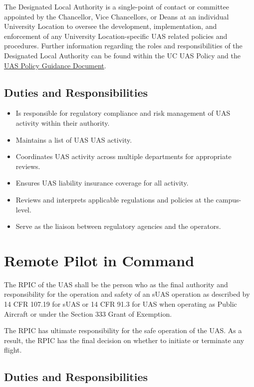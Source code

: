 \documentclass[
]{book}
\providecommand{\tightlist}{%
  \setlength{\itemsep}{0pt}\setlength{\parskip}{0pt}}
\begin{document}
The Designated Local Authority is a single-point of contact or committee appointed by the Chancellor, Vice Chancellors, or Deans at an individual University Location to oversee the development, implementation, and enforcement of any University Location-specific UAS related policies and procedures. Further information regarding the roles and responsibilities of the Designated Local Authority can be found within the UC UAS Policy and the \href{https://ucdrones.github.io/Policy_Guidance/}{UAS Policy Guidance Document}.

\subsection{Duties and Responsibilities}\label{duties-and-responsibilities-1}

\begin{itemize}
\tightlist
\item
  Is responsible for regulatory compliance and risk management of UAS activity within their authority.
\item
  Maintains a list of UAS UAS activity.
\item
  Coordinates UAS activity across multiple departments for appropriate reviews.
\item
  Ensures UAS liability insurance coverage for all activity.
\item
  Reviews and interprets applicable regulations and policies at the campus-level.
\item
  Serve as the liaison between regulatory agencies and the operators.
\end{itemize}

\section{Remote Pilot in Command}\label{remote-pilot-in-command}

The RPIC of the UAS shall be the person who as the final authority and responsibility for the operation and safety of an sUAS operation as described by 14 CFR 107.19 for sUAS or 14 CFR 91.3 for UAS when operating as Public Aircraft or under the Section 333 Grant of Exemption.

The RPIC has ultimate responsibility for the safe operation of the UAS. As a result, the RPIC has the final decision on whether to initiate or terminate any flight.

\subsection{Duties and Responsibilities}\label{duties-and-responsibilities-2}
\end{document}
